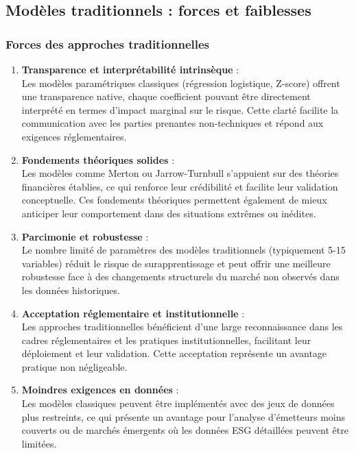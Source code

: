 \subsection{Modèles traditionnels : forces et faiblesses}

\subsubsection{Forces des approches traditionnelles}

\begin{enumerate}
  \item \textbf{Transparence et interprétabilité intrinsèque} : \\
  Les modèles paramétriques classiques (régression logistique, Z-score) offrent une transparence native, chaque coefficient pouvant être directement interprété en termes d'impact marginal sur le risque. Cette clarté facilite la communication avec les parties prenantes non-techniques et répond aux exigences réglementaires.

  \item \textbf{Fondements théoriques solides} : \\
  Les modèles comme Merton ou Jarrow-Turnbull s'appuient sur des théories financières établies, ce qui renforce leur crédibilité et facilite leur validation conceptuelle. Ces fondements théoriques permettent également de mieux anticiper leur comportement dans des situations extrêmes ou inédites.

  \item \textbf{Parcimonie et robustesse} : \\
  Le nombre limité de paramètres des modèles traditionnels (typiquement 5-15 variables) réduit le risque de surapprentissage et peut offrir une meilleure robustesse face à des changements structurels du marché non observés dans les données historiques.

  \item \textbf{Acceptation réglementaire et institutionnelle} : \\
  Les approches traditionnelles bénéficient d'une large reconnaissance dans les cadres réglementaires et les pratiques institutionnelles, facilitant leur déploiement et leur validation. Cette acceptation représente un avantage pratique non négligeable.

  \item \textbf{Moindres exigences en données} : \\
  Les modèles classiques peuvent être implémentés avec des jeux de données plus restreints, ce qui présente un avantage pour l'analyse d'émetteurs moins couverts ou de marchés émergents où les données ESG détaillées peuvent être limitées.
\end{enumerate}

